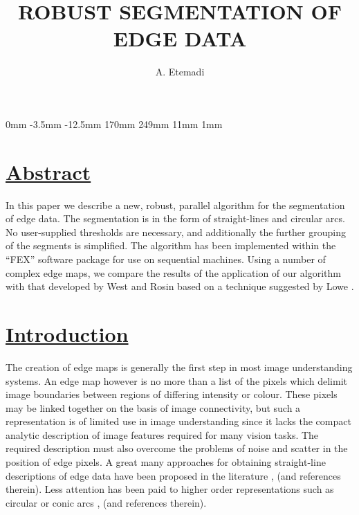 
\pagestyle{empty}
\setlength{\evensidemargin} {0mm}
\setlength{\oddsidemargin}  {-3.5mm}
\setlength{\topmargin}      {-12.5mm}
\setlength{\textwidth}      {170mm}
\setlength{\textheight}     {249mm}
\setlength{\columnsep}      {11mm}
\setlength{\unitlength}     {1mm}


\title{ROBUST SEGMENTATION OF EDGE DATA}
\author{A. Etemadi}
\address{University of Surrey, UK}

\maketitle

\section{\underline{Abstract}}

 In this paper we describe a new, robust, parallel algorithm for the 
segmentation of edge data. The segmentation is in the form of straight-lines 
and circular arcs. No user-supplied thresholds are necessary, and additionally 
the further grouping of the segments is simplified. The algorithm has been 
implemented within the ``FEX'' software package for use on sequential 
machines. Using a number of complex edge maps, we compare the results of the 
application of our algorithm with that developed by West and Rosin 
\cite{west91} based on a technique suggested by Lowe \cite{lowe87}.

\section{\underline{Introduction}}

 The creation of edge maps is generally the first step in most image 
understanding systems. An edge map however is no more than a list of the 
pixels which delimit image boundaries between regions of differing intensity 
or colour. These pixels may be linked together on the basis of image 
connectivity, but such a representation is of limited use in image 
understanding since it lacks the compact analytic description of image 
features required for many vision tasks. The required description must also 
overcome the problems of noise and scatter in the position of edge pixels. 
A great many approaches for obtaining straight-line descriptions of edge data 
have been proposed in the literature  \cite{hough62}, \cite{pridmore87} (and 
references therein). Less attention has been paid to higher order 
representations such as circular or conic arcs \cite{albano74}, 
\cite{thomas89} (and references therein). 

